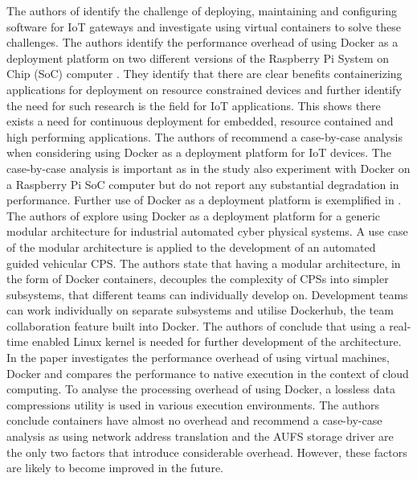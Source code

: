 The authors of \cite{2iot} identify the challenge of deploying, maintaining and configuring software for IoT gateways and investigate using virtual containers to solve these challenges. The authors identify the performance overhead of using Docker as a deployment platform on two different versions of the Raspberry Pi System on Chip (SoC) computer \cite{raspberry}. They identify that there are clear benefits containerizing applications for deployment on resource constrained devices and further identify the need for such research is the field for IoT applications. This shows there exists a need for continuous deployment for embedded, resource contained and high performing applications. The authors of \cite{2iot} recommend a case-by-case analysis when considering using Docker as a deployment platform for IoT devices. The case-by-case analysis is important as in \cite{gonz} the study also experiment with Docker on a Raspberry Pi SoC computer but do not report any substantial degradation in performance. Further use of Docker as a deployment platform is exemplified in \cite{gonz}. The authors of \cite{gonz} explore using Docker as a deployment platform for a generic modular architecture for industrial automated cyber physical systems. A use case of the modular architecture is applied to the development of an automated guided vehicular CPS. The authors state that having a modular architecture, in the form of Docker containers, decouples the complexity of CPSs into simpler subsystems, that different teams can individually develop on. Development teams can work individually on separate subsystems and utilise Dockerhub, the team collaboration feature built into Docker. The authors of \cite{gonz} conclude that using a real-time enabled Linux kernel is needed for further development of the architecture. \\

In \cite{p6} the paper investigates the performance overhead of using virtual machines, Docker and compares the performance to native execution in the context of cloud computing. To analyse the processing overhead of using Docker, a lossless data compressions utility is used in various execution environments. The authors conclude containers have almost no overhead and recommend a case-by-case analysis as using network address translation and the AUFS storage driver are the only two factors that introduce considerable overhead. However, these factors are likely to become improved in the future. \\

